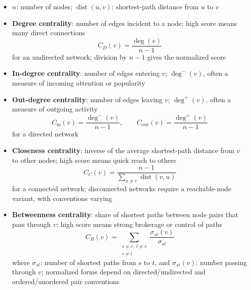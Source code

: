 \begin{itemize}
    \item \(n\): number of nodes; \(\operatorname{dist}(u,v)\): shortest-path distance from \(u\) to \(v\)
    \item \textbf{Degree centrality}: number of edges incident to a node; high score means many direct connections
          \[
              C_D(v)=\frac{\deg(v)}{n-1}
          \]
          for an undirected network; division by \(n-1\) gives the normalized score
    \item \textbf{In-degree centrality}: number of edges entering \(v\); \(\deg^-(v)\), often a measure of incoming attention or popularity
    \item \textbf{Out-degree centrality}: number of edges leaving \(v\); \(\deg^+(v)\), often a measure of outgoing activity
          \[
              C_{\mathrm{in}}(v)=\frac{\deg^-(v)}{n-1},
              \qquad
              C_{\mathrm{out}}(v)=\frac{\deg^+(v)}{n-1}
          \]
          for a directed network
    \item \textbf{Closeness centrality}: inverse of the average shortest-path distance from \(v\) to other nodes; high score means quick reach to others
          \[
              C_C(v)=\frac{n-1}{\sum_{u\ne v}\operatorname{dist}(v,u)}
          \]
          for a connected network; disconnected networks require a reachable-node variant, with conventions varying
    \item \textbf{Betweenness centrality}: share of shortest paths between node pairs that pass through \(v\); high score means strong brokerage or control of paths
          \[
              C_B(v)=\sum_{\substack{s\ne v,\ t\ne v\\s\ne t}}
              \frac{\sigma_{st}(v)}{\sigma_{st}}
          \]
          where \(\sigma_{st}\): number of shortest paths from \(s\) to \(t\), and \(\sigma_{st}(v)\): number passing through \(v\); normalized forms depend on directed/undirected and ordered/unordered pair conventions
\end{itemize}
